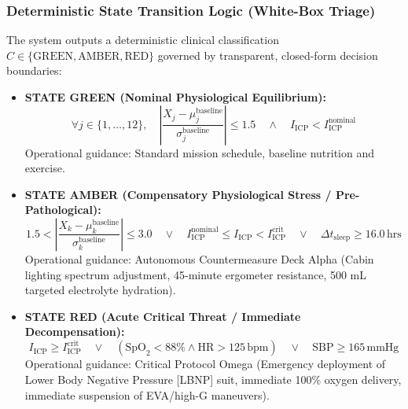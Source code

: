 \documentclass[11pt,a4paper]{article}
\begin{document}
\subsubsection{Deterministic State Transition Logic (White-Box Triage)}
The system outputs a deterministic clinical classification $C \in \{\text{GREEN}, \text{AMBER}, \text{RED}\}$ governed by transparent, closed-form decision boundaries:
\begin{itemize}
    \item \textbf{STATE GREEN (Nominal Physiological Equilibrium):}
    \begin{equation}
    \forall j \in \{1,\dots,12\}, \quad \left| \frac{X_j - \mu_j^{\text{baseline}}}{\sigma_j^{\text{baseline}}} \right| \le 1.5 \quad \land \quad I_{\text{ICP}} < I_{\text{ICP}}^{\text{nominal}}
    \end{equation}
    Operational guidance: Standard mission schedule, baseline nutrition and exercise.

    \item \textbf{STATE AMBER (Compensatory Physiological Stress / Pre-Pathological):}
    \begin{equation}
    1.5 < \left| \frac{X_k - \mu_k^{\text{baseline}}}{\sigma_k^{\text{baseline}}} \right| \le 3.0 \quad \lor \quad I_{\text{ICP}}^{\text{nominal}} \le I_{\text{ICP}} < I_{\text{ICP}}^{\text{crit}} \quad \lor \quad \Delta t_{\text{sleep}} \ge 16.0\,\text{hrs}
    \end{equation}
    Operational guidance: Autonomous Countermeasure Deck Alpha (Cabin lighting spectrum adjustment, 45-minute ergometer resistance, 500 mL targeted electrolyte hydration).

    \item \textbf{STATE RED (Acute Critical Threat / Immediate Decompensation):}
    \begin{equation}
    I_{\text{ICP}} \ge I_{\text{ICP}}^{\text{crit}} \quad \lor \quad \left(\text{SpO}_2 < 88\% \land \text{HR} > 125\,\text{bpm}\right) \quad \lor \quad \text{SBP} \ge 165\,\text{mmHg}
    \end{equation}
    Operational guidance: Critical Protocol Omega (Emergency deployment of Lower Body Negative Pressure [LBNP] suit, immediate 100\% oxygen delivery, immediate suspension of EVA/high-G maneuvers).
\end{itemize}
\end{document}
